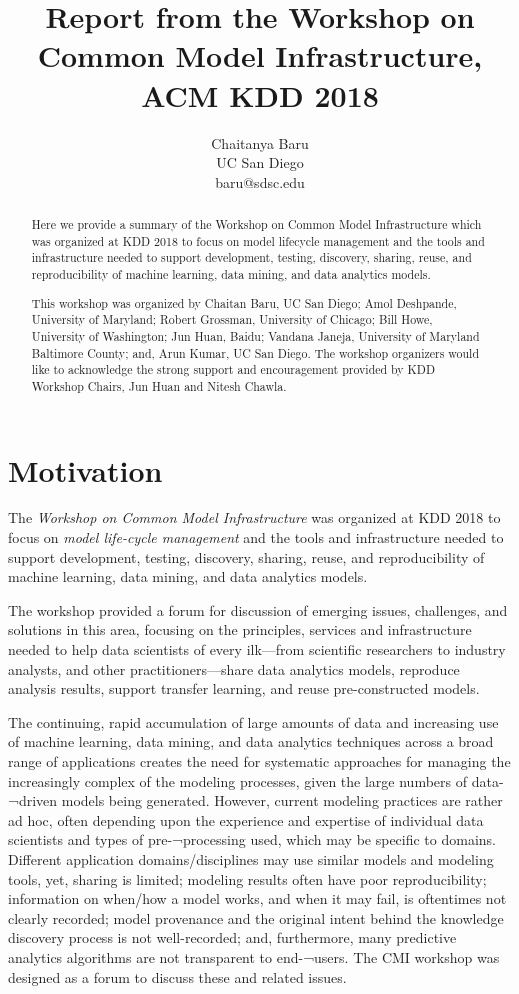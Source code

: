 \documentclass[11pt]{article}
\title{Report from the Workshop on Common Model Infrastructure, {ACM KDD 2018}}
\author{
Chaitanya Baru \\
       {UC San Diego}\\
       {baru@sdsc.edu} 
}
\begin{document}
\maketitle

\begin{abstract}
Here we provide a summary of the Workshop on Common Model Infrastructure which was organized at KDD 2018 to focus on model lifecycle management and the tools and infrastructure needed to support development, testing, discovery, sharing, reuse, and reproducibility of machine learning, data mining, and data analytics models. 

This workshop was organized by Chaitan Baru, UC San Diego; Amol Deshpande, University of Maryland; Robert Grossman, University of Chicago; Bill Howe, University of Washington; Jun Huan, Baidu; Vandana Janeja, University of Maryland Baltimore County; and, Arun Kumar, UC San Diego. The workshop organizers would like to acknowledge the strong support and encouragement provided by KDD Workshop Chairs, Jun Huan and Nitesh Chawla.
\end{abstract}




\section{Motivation}
The \emph{Workshop on Common Model Infrastructure} was organized at KDD 2018 to focus on \emph{model life-cycle management} and the tools and infrastructure needed to support development, testing, discovery, sharing, reuse, and reproducibility of machine learning, data mining, and data analytics models. 


The workshop provided a forum for discussion of emerging issues, challenges, and solutions in this area, focusing on the principles, services and infrastructure needed to help data scientists of every ilk---from scientific researchers to industry analysts, and other practitioners---share data analytics models, reproduce analysis results, support transfer learning, and reuse pre-constructed models.


The continuing, rapid accumulation of large amounts of data and increasing use of machine learning, data mining, and data analytics techniques across a broad range of applications creates the need for systematic approaches for managing the increasingly complex of the modeling processes, given the large numbers of data-¬driven models being generated. However, current modeling practices are rather ad hoc, often depending upon the experience and expertise of individual data scientists and types of pre-¬processing used, which may be specific to domains. Different application domains/disciplines may use similar models and modeling tools, yet, sharing is limited; modeling results often have poor reproducibility; information on when/how a model works, and when it may fail, is oftentimes not clearly recorded; model provenance and the original intent behind the knowledge discovery process is not well-recorded; and, furthermore, many predictive analytics algorithms are not transparent to end-¬users. The CMI workshop was designed as a forum to discuss these and related issues.
\end{document}
